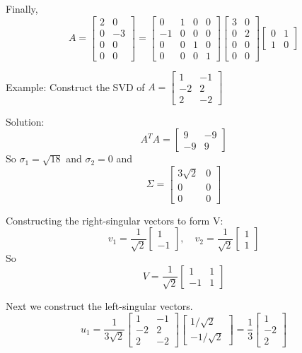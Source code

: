 \documentclass[12pt]{article} %
\begin{document}
{Finally,
$$A = \begin{bmatrix}
	2 & 0\\
	0 & -3\\
	0 & 0\\
	0 & 0
\end{bmatrix} = \begin{bmatrix}
	0 & 1 & 0 & 0\\
	-1 & 0 & 0 & 0\\
	0 & 0 & 1 & 0\\
	0 & 0 & 0 & 1
\end{bmatrix} \begin{bmatrix}
	3 & 0\\
	0 & 2\\
	0 & 0\\
	0 & 0
\end{bmatrix} \begin{bmatrix}
	0 & 1\\
	1 & 0
\end{bmatrix}$$

Example: Construct the SVD of $A = \begin{bmatrix}
	1 & -1\\
	-2 & 2\\
	2 & -2
\end{bmatrix}$

Solution:
$$A^T A = \begin{bmatrix}
	9 & -9\\
	-9 & 9
\end{bmatrix}$$
So $\sigma_1 = \sqrt{18}$ and $\sigma_2 = 0$ and 
$$\Sigma = \begin{bmatrix}
	3 \sqrt 2 & 0\\
	0 & 0\\
	0 & 0
\end{bmatrix}$$

Constructing the right-singular vectors to form V:
$$v_1 = \frac{1}{\sqrt{2}} \begin{bmatrix}
	1\\-1
\end{bmatrix}, \quad v_2 = \frac{1}{\sqrt{2}} \begin{bmatrix}
	1\\1
\end{bmatrix}$$
So
$$V = \frac{1}{\sqrt{2}} \begin{bmatrix}
	1 & 1\\
	-1 & 1
\end{bmatrix}$$

Next we construct the left-singular vectors.
$$u_1 = \frac{1}{3\sqrt{2}}\begin{bmatrix}
	1 & -1\\
	-2 & 2\\
	2 & -2
\end{bmatrix} \begin{bmatrix}
	1/\sqrt{2}\\
	-1/\sqrt{2}
\end{bmatrix} = \frac{1}{3} \begin{bmatrix}
	1\\-2\\2
\end{bmatrix}$$

}
\end{document}
